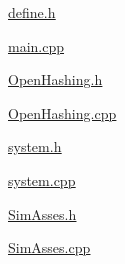 \href{../exp6/define.h.txt}{\underline{define.h}}

\href{../exp6/main.cpp.txt}{\underline{main.cpp}}

\href{../exp6/OpenHashing.h.txt}{\underline{OpenHashing.h}}

\href{../exp6/OpenHashing.cpp.txt}{\underline{OpenHashing.cpp}}

\href{../exp6/system.h.txt}{\underline{system.h}}

\href{../exp6/system.cpp.txt}{\underline{system.cpp}}

\href{../exp6/SimAsses.h.txt}{\underline{SimAsses.h}}

\href{../exp6/SimAsses.cpp.txt}{\underline{SimAsses.cpp}}
